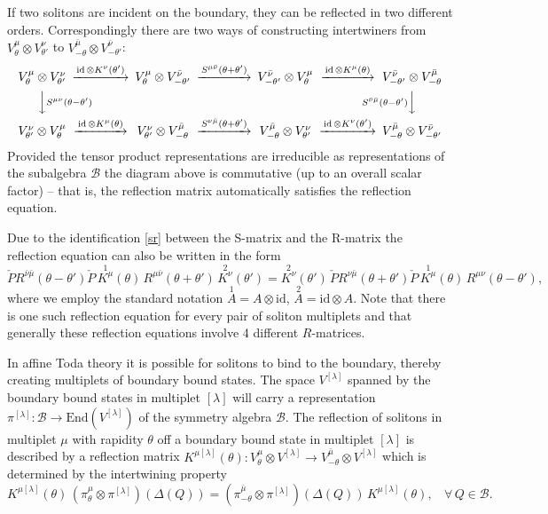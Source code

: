 \documentclass[a4paper,12pt]{article}
\newcommand{\End}{\text{End}}
\newcommand{\id}{\text{id}}
\newcommand{\mub}{\bar{\mu}}
\newcommand{\nub}{\bar{\nu}}
\newcommand{\sa}{{\mathcal{B}}}
\numberwithin{equation}{section}
\begin{document}
If two solitons are incident on the boundary, they can be
reflected in two different orders. Correspondingly there are two
ways of constructing intertwiners from $V^\mu_\theta\otimes
V^\nu_{\theta'}$ to $V^{\mub}_{-\theta}\otimes
V^{\bar{\nu}}_{-\theta'}$:
\begin{equation}
\begin{CD}\label{cdre}
  V^\mu_\theta\otimes V^\nu_{\theta'}
  @>\id\,\otimes K^\nu(\theta')>>
  V^\mu_\theta\otimes V^{\bar{\nu}}_{-\theta'}
  @>S^{\mu\bar{\nu}}(\theta+\theta')>>
  V^{\bar{\nu}}_{-\theta'}\otimes V^\mu_\theta
  @>\id\,\otimes K^\mu(\theta)>>
  V^{\bar{\nu}}_{-\theta'}\otimes V^{\bar{\mu}}_{-\theta}\\
  @VVS^{\mu\nu}(\theta-\theta')V
  @.@.
  @VS^{\bar{\nu}\bar{\mu}}(\theta-\theta')VV\\
  V^\nu_{\theta'}\otimes V^\mu_{\theta}
  @>\id\,\otimes K^\mu(\theta)>>
  V^\nu_{\theta'}\otimes V^{\bar{\mu}}_{-\theta}
  @>S^{\nu\bar{\mu}}(\theta+\theta')>>
  V^{\bar{\mu}}_{-\theta}\otimes V^\nu_{\theta'}
  @>\id\,\otimes K^\nu(\theta')>>
  V^{\bar{\mu}}_{-\theta}\otimes V^{\bar{\nu}}_{-\theta'}
\end{CD}
\end{equation}
Provided the tensor product representations are irreducible as
representations of the subalgebra $\sa$ the diagram above is
commutative (up to an overall scalar factor) -- that is, the
reflection matrix automatically satisfies the reflection equation.

Due to the identification \eqref{sr} between the S-matrix and the
R-matrix the reflection equation can also be written in the form
\begin{equation}\label{rn}
  \check{P}R^{\nub\mub}(\theta-\theta')\check{P}
  \,\overset{1}{K^\mu}(\theta)\,
  R^{\mu\nub}(\theta+\theta')
  \,\overset{2}{K^\nu}(\theta')
  =
  \overset{2}{K^\nu}(\theta')\,
  \check{P}R^{\nu\mub}(\theta+\theta')\check{P}
  \,\overset{1}{K^\mu}(\theta)\,
  R^{\mu\nu}(\theta-\theta'),
\end{equation}
where we employ the standard notation $\overset{1}{A}=A\otimes
\id$, $\overset{2}{A}=\id\otimes A$. Note that there is one such
reflection equation for every pair of soliton multiplets and that
generally these reflection equations involve 4 different
$R$-matrices.

In affine Toda theory it is possible for solitons to bind to the
boundary, thereby creating multiplets of boundary bound states.
The space $V^{[\lambda]}$  spanned by the boundary bound states in
multiplet $[\lambda]$ will carry a representation
$\pi^{[\lambda]}:\sa\rightarrow\End(V^{[\lambda]})$ of the
symmetry algebra $\sa$. The reflection of solitons in multiplet
$\mu$ with rapidity $\theta$ off a boundary bound state in
multiplet $[\lambda]$ is described by a reflection matrix
$K^{\mu[\lambda]}(\theta):V^\mu_\theta\otimes
V^{[\lambda]}\rightarrow V^{\mub}_{-\theta}\otimes V^{[\lambda]}$
which is determined by the intertwining property
\begin{equation}
  K^{\mu[\lambda]}(\theta)\,(\pi^\mu_\theta\otimes
  \pi^{[\lambda]})(\Delta(Q))=(\pi^{\mub}_{-\theta}\otimes
  \pi^{[\lambda]})(\Delta(Q))\,K^{\mu[\lambda]}(\theta),~~~~
  \forall \,Q\in\sa.
\end{equation}
\end{document}
